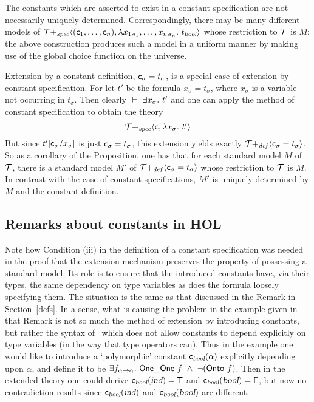 \medskip

The constants which are asserted to exist in a constant specification
are not necessarily uniquely determined.  Correspondingly, there may
be many different models of ${\cal T}{+_{\it
spec}}\langle({\sf c}_1,\ldots,{\sf c}_n),
\lambda {x_1}_{\sigma_1},\ldots,{x_n}_{\sigma_n}.\ t_{\textsl{bool}}
\rangle$ whose restriction to $\cal T$ is $M$; the above construction
produces such a model in a uniform manner by making use of the global
choice function on the universe.

Extension by a constant definition, ${\sf c}_\sigma=t_\sigma$, is a
special case of extension by constant specification. For let $t'$ be
the formula $x_\sigma=t_\sigma$, where $x_\sigma$ is a variable not
occurring in $t_\sigma$. Then clearly $\ \vdash\ 
\exists x_\sigma.\ t'$ and one can apply the method of constant
specification to obtain the theory
\[
{\cal T}{+_{\it spec}}\langle {\sf c},\lambda x_\sigma.\ t'\rangle
\]
But since $t'[{\sf c}_\sigma/x_\sigma]$ is just
${\sf c}_\sigma=t_\sigma$,
this extension yields exactly ${\cal T}{+_{\it def}}\langle
{\sf c}_{\sigma}=t_{\sigma}\rangle$.
So as a corollary of the Proposition, one has that for each standard
model $M$ of $\cal T$, there is a standard model $M'$ of ${\cal
T}{+_{\it def}}\langle{\sf c}_{\sigma}=t_{\sigma}\rangle$ whose
restriction to $\cal T$ is $M$. In contrast with the case of constant
specifications, $M'$ is uniquely determined by $M$ and the constant
definition.

\subsection{Remarks about constants in HOL}
\label{constants}

Note how Condition (iii) in the definition of a constant specification
was needed in the proof that the extension mechanism preserves the
property of possessing a standard model. Its role is to ensure that
the introduced constants have, via their types, the same dependency on
type variables as does the formula loosely specifying them. The
situation is the same as that discussed in the Remark in
Section~\ref{defs}. In a sense, what is causing the problem in the
example given in that Remark is not so much the method of extension by
introducing constants, but rather the syntax of \HOL\ which does not
allow constants to depend explicitly on type variables (in the way
that type operators can). Thus in the example one would like to
introduce a `polymorphic' constant ${\sf c}_{\textsl{bool}}(\alpha)$
explicitly depending upon $\alpha$, and define it to be
$\exists f_{\alpha{\to}\alpha}.\  {\sf One\_One} \ f \ \wedge\ 
\neg({\sf Onto} \ f)$.  Then in the extended theory one could derive
${\sf c}_{\textsl{bool}}(\textsl{ind})={\sf T}$ and
${\sf c}_{\textsl{bool}}(\textsl{bool})={\sf F}$, but now no contradiction results since
${\sf c}_{\textsl{bool}}(\textsl{ind})$ and ${\sf c}_{\textsl{bool}}(\textsl{bool})$
are different.

